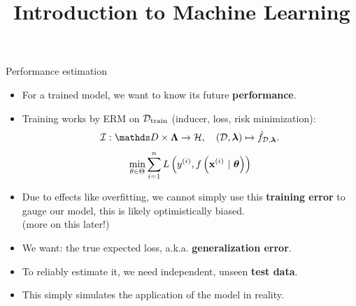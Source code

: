 \documentclass[11pt,compress,t,notes=noshow, xcolor=table]{beamer}
\title{Introduction to Machine Learning}
\institute{\href{https://compstat-lmu.github.io/lecture_i2ml/}{compstat-lmu.github.io/lecture\_i2ml}}
\date{}
\begin{document}
\sloppy


\begin{vbframe}{Performance estimation}

\begin{itemize}
  \item For a trained model, we want to know its future \textbf{performance}.
  \item Training works by ERM on $\mathcal{D}_{\text{train}}$ (inducer, loss, risk minimization):
  $$\ind: \preimageInducerShort \rightarrow \Hspace, \quad (\D, \lamv)
  \mapsto \fhDlam.$$
  $$ \min_{\theta \in \Theta} \sum\limits_{i=1}^n L\left(y^{(i)}, f\left(\mathbf{x}^{(i)} ~|~ \bm{\theta}\right)\right) $$ 
  \item Due to effects like overfitting, we cannot simply use this \textbf{training error}
      to gauge our model, this is likely optimistically biased.\\ 
      (more on this later!)
  \item We want: the true expected loss, a.k.a. \textbf{generalization error}.
  \item To reliably estimate it, we need independent, unseen \textbf{test data}. 
  \item This simply simulates the application of the model in reality.    
\end{itemize}
\end{vbframe}
\end{document}
